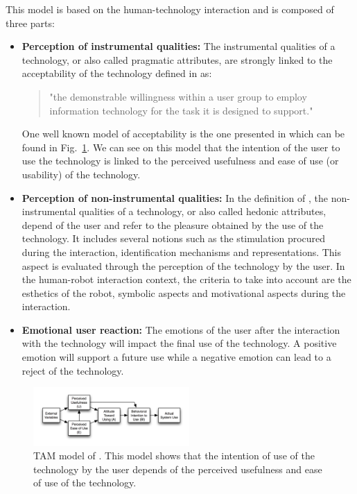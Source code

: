 \documentclass[english,a4paper,11pt,twoside]{StyleThese}
\begin{document}
This model is based on the human-technology interaction and is composed of three parts:
\begin{itemize}
\item \textbf{Perception of instrumental qualities:}
The instrumental qualities of a technology, or also called pragmatic attributes, are strongly linked to the acceptability of the technology defined in \cite{dillon2001user} as:
\begin{quote}
"the demonstrable willingness within a user group to employ information technology for the task it is designed to support."
\end{quote} 
One well known model of acceptability is the one presented in \cite{davis1989perceived} which can be found in Fig.~\ref{fig:TAM}. We can see on this model that the intention of the user to use the technology is linked to the perceived usefulness and ease of use (or usability) of the technology.
\item \textbf{Perception of non-instrumental qualities:}
In the definition of \cite{hassenzahl2003thing}, the non-instrumental qualities of a technology, or also called hedonic attributes, depend of the user and refer to the pleasure obtained by the use of the technology. It includes several notions such as the stimulation procured during the interaction, identification mechanisms and representations. This aspect is evaluated through the perception of the technology by the user. In the human-robot interaction context, the criteria to take into account are the esthetics of the robot, symbolic aspects and motivational aspects during the interaction.
\item \textbf{Emotional user reaction:}
The emotions of the user after the interaction with the technology will impact the final use of the technology. A positive emotion will support a future use while a negative emotion can lead to a reject of the technology.
\end{itemize}

\begin{figure}[!h]
	\centering
    \includegraphics[width=0.53\textwidth]{figs/Chapter5/TAM.png}
    \caption{TAM model of \cite{davis1989perceived}. This model shows that the intention of use of the technology by the user depends of the perceived usefulness and ease of use of the technology.}
    \label{fig:TAM}
\end{figure}
\end{document}

